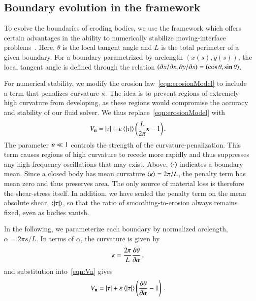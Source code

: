\documentclass[preprint, 10pt]{elsarticle}
\begin{document}
\subsection{Boundary evolution in the {\thL} framework} 
\label{sec:thetaL}

To evolve the boundaries of eroding bodies, we use the {\thL} framework which offers certain advantages in the ability to numerically stabilize moving-interface problems~\cite{hou-low-she1994}. Here, $\theta$ is the local tangent angle and $L$ is the total perimeter of a given boundary. For a boundary parametrized by arclength $(x(s),y(s))$, the local tangent angle is defined through the relation $\left( \partial {x}/\partial {s}, \partial {y}/\partial {s} \right) = \left(\cos \theta, \sin \theta \right)$.

For numerical stability, we modify the erosion law~\eqref{eqn:erosionModel} to include a term that penalizes curvature $\kappa$. The idea is to prevent regions of extremely high curvature from developing, as these regions would compromise the accuracy and stability of our fluid solver. We thus replace~\eqref{eqn:erosionModel} with
\begin{align}
  \label{eqn:Vn}
  V_{\mathbf{n}} = \lvert \tau \rvert + \varepsilon \left< \lvert \tau \rvert \right> \left( \frac{L }{2\pi} \kappa - 1 \right).
\end{align}
The parameter $\varepsilon \ll 1$ controls the strength of the curvature-penalization. This term causes regions of high curvature to recede more rapidly and thus suppresses any high-frequency oscillations that may exist. Above, $\left< \cdot \right>$ indicates a boundary mean. Since a closed body has mean curvature $\left< \kappa \right> = 2\pi / L$, the penalty term has mean zero and thus preserves area. The only source of material loss is therefore the shear-stress itself. In addition, we have scaled the penalty term on the mean absolute shear, $\left< \lvert \tau \rvert \right>$, so that the ratio of smoothing-to-erosion always remains fixed, even as bodies vanish.

In the following, we parameterize each boundary by normalized arclength, $\alpha = 2 \pi s / L$. In terms of $\alpha$, the curvature is given by
\begin{align}
\kappa = \frac{2 \pi}{L} \frac{\partial \theta}{\partial \alpha} \, ,
\end{align}
and substitution into~\eqref{eqn:Vn} gives
\begin{align}
\label{eqn:Vn2}
V_{\mathbf{n}} = \lvert \tau \rvert +  \varepsilon \left< \lvert \tau \rvert \right>   \left(\frac{\partial \theta}{\partial \alpha} - 1 \right) \, .
\end{align}
\end{document}
